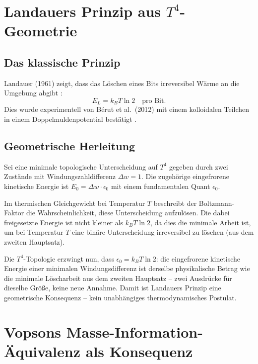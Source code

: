 \section{Landauers Prinzip aus \(T^4\)-Geometrie}

\subsection{Das klassische Prinzip}

Landauer (1961) zeigt, dass das Löschen eines Bits
irreversibel Wärme an die Umgebung abgibt \cite{Landauer1961}:
\begin{equation}
  E_L = k_B T \ln 2 \quad \text{pro Bit.}
  \label{eq:landauer}
\end{equation}
Dies wurde experimentell von Bérut et al.\ (2012) mit einem
kolloidalen Teilchen in einem Doppelmuldenpotential bestätigt
\cite{Berut2012}.

\subsection{Geometrische Herleitung}

Sei eine minimale topologische Unterscheidung auf \(T^4\) gegeben
durch zwei Zustände mit Windungszahldifferenz \(\Delta w = 1\).
Die zugehörige eingefrorene kinetische Energie ist
\(E_0 = \Delta w \cdot \epsilon_0\) mit einem fundamentalen Quant \(\epsilon_0\).

Im thermischen Gleichgewicht bei Temperatur \(T\) beschreibt der
Boltzmann-Faktor die Wahrscheinlichkeit, diese Unterscheidung aufzulösen.
Die dabei freigesetzte Energie ist nicht kleiner als \(k_B T \ln 2\),
da dies die minimale Arbeit ist, um bei Temperatur \(T\) eine binäre
Unterscheidung irreversibel zu löschen (aus dem zweiten Hauptsatz).

Die \(T^4\)-Topologie erzwingt nun, dass
\(\epsilon_0 = k_B T \ln 2\):
die eingefrorene kinetische Energie einer minimalen Windungsdifferenz
ist derselbe physikalische Betrag wie die minimale Löscharbeit aus
dem zweiten Hauptsatz -- zwei Ausdrücke für dieselbe Größe,
keine neue Annahme. Damit ist Landauers Prinzip eine
geometrische Konsequenz -- kein unabhängiges thermodynamisches Postulat.

\section{Vopsons Masse-Information-Äquivalenz als Konsequenz}

